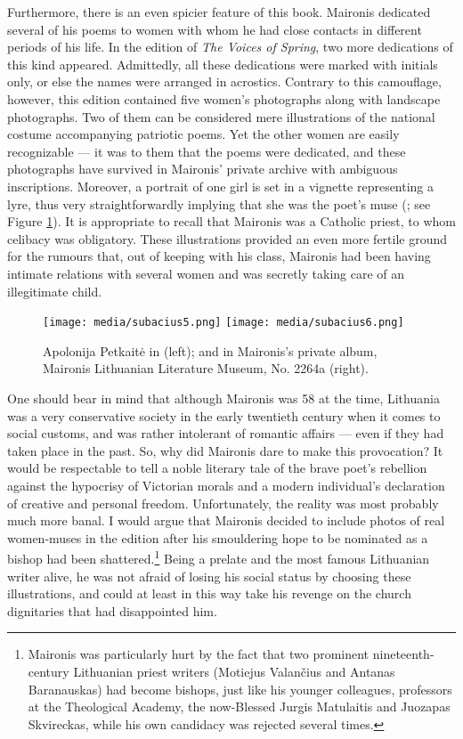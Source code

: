 \begin{paper}
Furthermore, there is an even spicier feature of this book. Maironis dedicated
several of his poems to women with whom he had close contacts in
different periods of his life. In the \citeyear{maironis_pavasario_1920} edition of \emph{The Voices
of Spring}, two more dedications of this kind appeared. Admittedly, all these dedications were marked with initials only, or else the names were arranged in
acrostics. Contrary to this camouflage, however,  this edition contained five women's photographs along with landscape
photographs. Two of
them can be considered mere illustrations of the national costume
accompanying patriotic poems. Yet the other women are easily
recognizable --- it was to them that the poems were dedicated, and these
photographs have survived in Maironis' private archive with ambiguous
inscriptions. Moreover, a portrait of one girl is set in a vignette
representing a lyre, thus very straightforwardly implying that she was
the poet's muse (\citealt[94]{maironis_pavasario_1920}; see Figure \ref{fig:subacius:apolonija}). It is appropriate to
recall that Maironis was a Catholic priest, to whom celibacy was
obligatory. These illustrations provided an even more fertile ground for
the rumours that, out of keeping with his class, Maironis had been having
intimate relations with several women and was secretly taking care of
an illegitimate child.

\begin{figure}
\centering
\texttt{[image: media/subacius5.png]}
\texttt{[image: media/subacius6.png]}
\caption{Apolonija Petkaitė in \citealt[94]{maironis_pavasario_1920} (left); and in Maironis’s private album, Maironis Lithuanian Literature Museum, No. 2264a (right).}
\label{fig:subacius:apolonija}
\end{figure}

One should bear in mind that although Maironis was 58 at the time, Lithuania
was a very conservative society in the early twentieth century when it comes to social customs, and was rather intolerant of romantic affairs ---
even if they had taken place in the past. So, why did Maironis dare to make
this provocation? It would be respectable to tell a noble literary tale
of the brave poet's rebellion against the hypocrisy of Victorian morals
and a modern individual's declaration of creative and personal freedom.
Unfortunately, the reality was most probably much more banal. I would argue that Maironis decided
to include photos of real women-muses in the edition after his
smouldering hope to be nominated as a bishop had been
shattered.\footnote{Maironis was particularly hurt by the fact that two
  prominent nineteenth-century Lithuanian priest writers (Motiejus
  Valančius and Antanas Baranauskas) had become bishops, just like his
  younger colleagues, professors at the Theological Academy, the
  now-Blessed Jurgis Matulaitis and Juozapas Skvireckas, while his own
  candidacy was rejected several times.} Being a prelate and the most
famous Lithuanian writer alive, he was not afraid of losing his social
status by choosing these illustrations, and could at
least in this way take his revenge on the church dignitaries that had disappointed him.


\end{paper}
